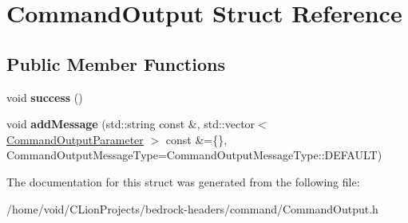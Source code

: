 \hypertarget{struct_command_output}{}\section{Command\+Output Struct Reference}
\label{struct_command_output}
\subsection*{Public Member Functions}
\begin{DoxyCompactItemize}
\item 
\mbox{\label{struct_command_output_a30a4a8b4606aca445e1c7fd40444f9d2}} 
void {\bfseries success} ()
\item 
\mbox{\label{struct_command_output_ad070e6376ffc37d5727492505fb14c15}} 
void {\bfseries add\+Message} (std\+::string const \&, std\+::vector$<$ \mbox{\hyperlink{struct_command_output_parameter}{Command\+Output\+Parameter}} $>$ const \&=\{\}, Command\+Output\+Message\+Type=Command\+Output\+Message\+Type\+::\+D\+E\+F\+A\+U\+LT)
\end{DoxyCompactItemize}


The documentation for this struct was generated from the following file\+:\begin{DoxyCompactItemize}
\item 
/home/void/\+C\+Lion\+Projects/bedrock-\/headers/command/Command\+Output.\+h\end{DoxyCompactItemize}
